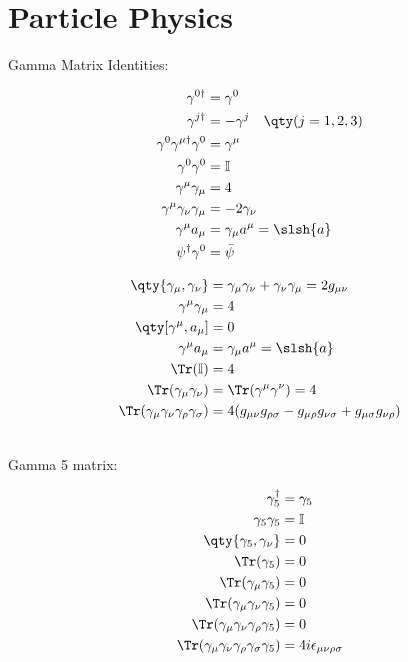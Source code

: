
\section{Particle Physics}
Gamma Matrix Identities:
\\
\begin{minipage}{0.45\textwidth}
	\begin{align*}
		\gamma^{0\dagger}&=\gamma^0
		\\
		\gamma^{j\dagger}&=-\gamma^j\quad\qty(j=1,2,3)
		\\
		\gamma^0\gamma^{\mu\dagger}\gamma^0&=\gamma^\mu
		\\
		\gamma^{0}\gamma^{0}&=\mathbb{I}
		\\
		\gamma^\mu\gamma_\mu&=4
		\\
		\gamma^\mu\gamma_\nu\gamma_\mu&=-2\gamma_\nu
		\\
		\gamma^\mu a_\mu&=\gamma_\mu a^\mu=\slsh{a}
		\\
		\psi^\dagger\gamma^0&=\bar{\psi}
	\end{align*}
\end{minipage}
\begin{minipage}{0.48\textwidth}
	\begin{align*}
		\qty{\gamma_\mu,\gamma_\nu}&=\gamma_\mu\gamma_\nu+\gamma_\nu\gamma_\mu=2g_{\mu\nu}
		\\
		\gamma^\mu\gamma_\mu&=4
		\\
		\qty[\gamma^\mu,a_\mu]&=0
		\\
		\gamma^\mu a_\mu&=\gamma_\mu a^\mu=\slsh{a}
		\\
		\Tr(\mathbb{I})&=4
		\\
		\Tr(\gamma_\mu\gamma_\nu)&=\Tr(\gamma^\mu\gamma^\nu)=4
		\\
		\Tr(\gamma_\mu\gamma_\nu\gamma_\rho\gamma_\sigma)&=4(g_{\mu\nu}g_{\rho\sigma}-g_{\mu\rho}g_{\nu\sigma}+g_{\mu\sigma}g_{\nu\rho})
	\end{align*}
\end{minipage}
\\[0.25 cm]
Gamma 5 matrix:
\\
\begin{minipage}{0.45\textwidth}
	\begin{align*}
		\gamma_5^\dagger&=\gamma_5
		\\
		\gamma_{5}\gamma_{5}&=\mathbb{I}
		\\
		\qty{\gamma_5,\gamma_\nu}&=0
		\\
		\Tr(\gamma_5)&=0
		\\
		\Tr(\gamma_\mu\gamma_5)&=0
		\\
		\Tr(\gamma_\mu\gamma_\nu\gamma_5)&=0
		\\
		\Tr(\gamma_\mu\gamma_\nu\gamma_\rho\gamma_5)&=0
		\\
		\Tr(\gamma_\mu\gamma_\nu\gamma_\rho\gamma_\sigma\gamma_5)&=4i\epsilon_{\mu\nu\rho\sigma}
	\end{align*}
\end{minipage}
